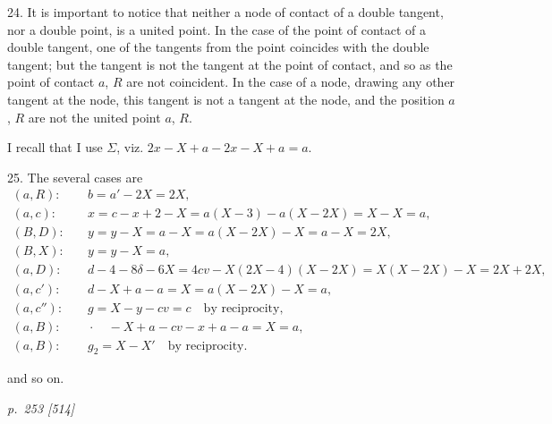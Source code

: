 \documentclass[11pt,a4paper]{article}
\theoremstyle{plain}
\theoremstyle{definition}
\begin{document}
24.  It is important to notice that neither a node of contact of a double tangent,
nor a double point, is a united point.  In the case of the point of contact of a double
tangent, one of the tangents from the point coincides with the double tangent; but
the tangent is not the tangent at the point of contact, and so as the point of contact
$a$, $R$ are not coincident.  In the case of a node, drawing any other tangent at the
node, this tangent is not a tangent at the node, and the position $a$, $R$ are not the
united point $a$, $R$.

I recall that I use $\Sigma$, viz. $2x - X + a - 2x - X + a = a$.

25.  The several cases are
\begin{align*}
(a, R): & \quad b = a' - 2X = 2X, \\
(a, c): & \quad x = c - x + 2 - X = a(X - 3) - a(X - 2X) = X - X = a, \\
(B, D): & \quad y = y - X = a - X = a(X - 2X) - X = a - X = 2X, \\
(B, X): & \quad y = y - X = a, \\
(a, D): & \quad d - 4 - 8\delta - 6X = 4cv - X(2X - 4)(X - 2X) = X(X - 2X) - X = 2X + 2X, \\
(a, c'): & \quad d - X + a - a = X = a(X - 2X) - X = a, \\
(a, c''): & \quad g = X - y - cv = c \quad \text{by reciprocity,} \\
(a, B): & \quad \cdot \quad - X + a - cv - x + a - a = X = a, \\
(a, B): & \quad g_2 = X - X' \quad \text{by reciprocity.}
\end{align*}

and so on.

\clearpage

\bigskip
\textit{p.~253 [514]}
\smallskip
\end{document}
